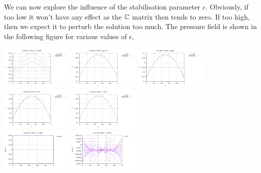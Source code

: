 We can now explore the influence of the stabilisation parameter $\epsilon$. Obviously, 
if too low it won't have any effect as the ${\mathbb{C}}$ matrix then tends to zero. If too high,
then we expect it to perturb the solution too much. 
The pressure field is shown in the following figure for various values of $\epsilon$, 


\begin{center}
\includegraphics[width=3.4cm]{python_codes/fieldstone_115/results/dh/pressure_nostab.pdf}
\includegraphics[width=3.4cm]{python_codes/fieldstone_115/results/dh/pressure_penalty.pdf}
\includegraphics[width=3.4cm]{python_codes/fieldstone_115/results/dh/pressure_global.pdf}
\includegraphics[width=3.4cm]{python_codes/fieldstone_115/results/dh/pressure_local.pdf}
\includegraphics[width=3.4cm]{python_codes/fieldstone_115/results/dh/pressure_macro.pdf}\\
\includegraphics[width=3.4cm]{python_codes/fieldstone_115/results/dh/pressure_nostab_error.pdf}
\includegraphics[width=3.4cm]{python_codes/fieldstone_115/results/dh/pressure_penalty_error.pdf}

\end{center}
